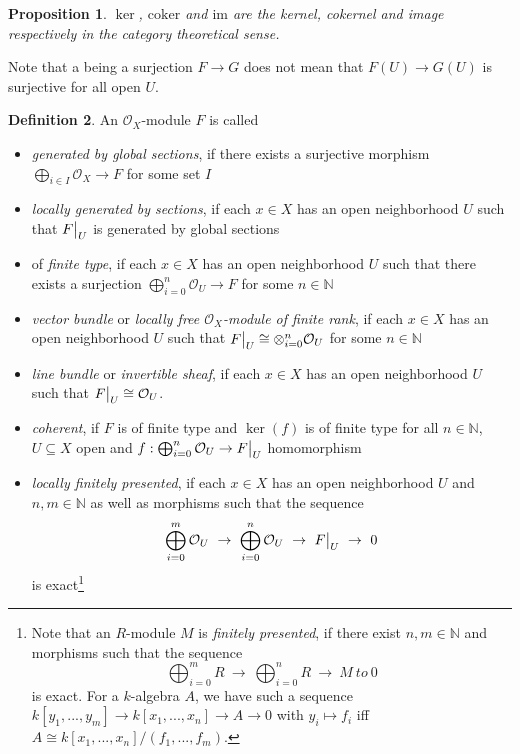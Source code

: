 \documentclass{scrartcl}
\newcommand{\N}{\mathbb{N}}
\newcommand{\im}{\mathrm{im}}
\renewcommand{\O}{\mathcal{O}}
\newcommand\restr[2]{{
    \left.\kern-\nulldelimiterspace
    #1
    \vphantom{\big|}
    \right|_{#2}
}}
\newtheorem{prop}{Proposition}[section]
\theoremstyle{definition}
\newtheorem{definition}[prop]{Definition}
\begin{document}
\begin{prop}
    $\ker$, $\mathrm{coker}$ and $\im$ are the kernel, cokernel and image respectively in the category theoretical sense.
\end{prop}
Note that a being a surjection $F \to G$ does not mean that $F(U) \to G(U)$ is surjective for all open $U$. 
\begin{definition}
    An $\O_X$-module $F$ is called
    \begin{itemize}
        \item \emph{generated by global sections}, if there exists a surjective morphism $\bigoplus_{i \in I} \O_X \to F$ for some set $I$
        \item \emph{locally generated by sections}, if each $x \in X$ has an open neighborhood $U$ such that $\restr{F}{U}$ is generated by global sections
        \item of \emph{finite type}, if each $x \in X$ has an open neighborhood $U$ such that there exists a surjection $\bigoplus_{i = 0}^n \O_U \to F$ for some $n \in \N$
        \item \emph{vector bundle} or \emph{locally free $\O_X$-module of finite rank}, if each $x \in X$ has an open neighborhood $U$ such that $\restr{F}{U} \cong \otimes_{i = 0}^n \O_U$ for some $n \in \N$
        \item \emph{line bundle} or \emph{invertible sheaf}, if each $x \in X$ has an open neighborhood $U$ such that $\restr{F}{U} \cong \O_U$.
        \item \emph{coherent}, if $F$ is of finite type and $\ker(f)$ is of finite type for all $n \in \N$, $U \subseteq X$ open and $f: \bigoplus_{i = 0}^n \O_U \to \restr{F}{U}$ homomorphism
        \item \emph{locally finitely presented}, if each $x \in X$ has an open neighborhood $U$ and $n, m \in \N$ as well as morphisms such that the sequence
        \begin{equation*}
            \bigoplus_{i = 0}^m \O_U \ \to \ \bigoplus_{i = 0}^n \O_U \ \to \ \restr{F}{U} \ \to \ 0
        \end{equation*}
        is exact\footnote{
            Note that an $R$-module $M$ is \emph{finitely presented}, if there exist $n, m \in \N$ and morphisms such that the sequence
            \begin{equation*}
                \bigoplus_{i = 0}^m R \ \to \ \bigoplus_{i = 0}^n R \ \to \ M \ to \ 0
            \end{equation*} 
            is exact.
            For a $k$-algebra $A$, we have such a sequence $k[y_1, ..., y_m] \to k[x_1, ..., x_n] \to A \to 0$ with $y_i \mapsto f_i$ iff $A \cong k[x_1, ..., x_n]/(f_1, ..., f_m)$.
        }
    \end{itemize}
\end{definition}
\end{document}

